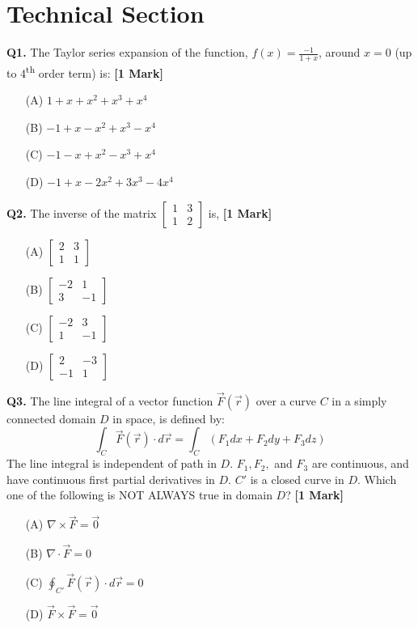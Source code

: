\documentclass[11pt]{article}
\newcommand{\questiona}[2]{
    \noindent\textbf{Q#2.} #1 \hfill \textbf{[1 Mark]}
}
\begin{document}
\section*{Technical Section}

\questiona{The Taylor series expansion of the function, \( f(x) = \frac{-1}{1+x} \), around \( x = 0 \) (up to 4\textsuperscript{th} order term) is:}{1}
\begin{enumerate}
    \item[(A)] \( 1 + x + x^2 + x^3 + x^4 \)  
    \item[(B)] \( -1 + x - x^2 + x^3 - x^4 \)  
    \item[(C)] \( -1 - x + x^2 - x^3 + x^4 \)  
    \item[(D)] \( -1 + x - 2x^2 + 3x^3 - 4x^4 \)  
\end{enumerate}
\vspace{0.5cm}

\questiona{The inverse of the matrix \(\begin{bmatrix}1 & 3\\1 & 2\end{bmatrix}\) is,}{2}
\begin{enumerate}
    \item[(A)] \(\begin{bmatrix}2 & 3\\1 & 1\end{bmatrix}\)  
    \item[(B)] \(\begin{bmatrix}-2 & 1\\3 & -1\end{bmatrix}\)  
    \item[(C)] \(\begin{bmatrix}-2 & 3\\1 & -1\end{bmatrix}\)  
    \item[(D)] \(\begin{bmatrix}2 & -3\\-1 & 1\end{bmatrix}\)  
\end{enumerate}
\vspace{0.5cm}

\questiona{The line integral of a vector function \( \vec{F}(\vec{r}) \) over a curve \( C \) in a simply connected domain \( D \) in space, is defined by: \[ \int_C \vec{F}(\vec{r}) \cdot d\vec{r} = \int_C (F_1 dx + F_2 dy + F_3 dz) \] The line integral is independent of path in \( D \). \( F_1, F_2, \) and \( F_3 \) are continuous, and have continuous first partial derivatives in \( D \). \( C' \) is a closed curve in \( D \). Which one of the following is NOT ALWAYS true in domain \( D \)?}{3}
\begin{enumerate}
    \item[(A)] \( \nabla \times \vec{F} = \vec{0} \)  
    \item[(B)] \( \nabla \cdot \vec{F} = 0 \)  
    \item[(C)] \( \oint_{C'} \vec{F}(\vec{r}) \cdot d\vec{r} = 0 \)  
    \item[(D)] \( \vec{F} \times \vec{F} = \vec{0} \)  
\end{enumerate}
\vspace{0.5cm}
\end{document}
